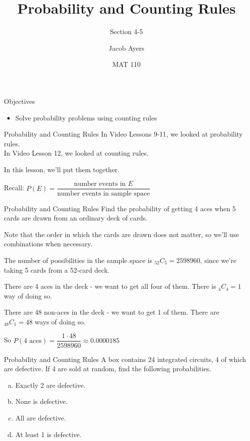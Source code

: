 \documentclass[t, aspectratio=169]{beamer}
\title[4-5]{Probability and Counting Rules}
\subtitle{Section 4-5}
\author{Jacob Ayers}
\institute{Lesson \#13}
\date{MAT 110}
\newcommand{\?}{\stackrel{?}{=}}
\begin{document}
	
	\begin{frame}
		\titlepage
	\end{frame}
	
	\begin{frame}{Objectives}
		\begin{itemize}
			\item Solve probability problems using counting rules
		\end{itemize}
	\end{frame}

	\begin{frame}{Probability and Counting Rules}
		In Video Lessons 9-11, we looked at probability rules. \\
		In Video Lesson 12, we looked at counting rules. \pause
		
		In this lesson, we'll put them together. \pause
		
		Recall: $P(E) = \dfrac{\text{number events in $E$}}{\text{number events in sample space}}$
	\end{frame}

	\begin{frame}{Probability and Counting Rules}
		Find the probability of getting 4 aces when 5 cards are drawn from an ordinary deck of cards. \pause
		
		Note that the order in which the cards are drawn does not matter, so we'll use combinations when necessary. \pause
		
		The number of possibilities in the sample space is $_{52} C _5 = 2598960$, since we're taking 5 cards from a 52-card deck.
		
		There are 4 aces in the deck - we want to get all four of them. There is $_4 C _4 = 1$ way of doing so. \pause
		
		There are 48 non-aces in the deck - we want to get 1 of them. There are $_{48} C _1 = 48$ ways of doing so. \pause
		
		So $P(\text{4 aces}) = \dfrac{1 \cdot 48}{2598960} \approx 0.0000185$
	\end{frame}

	\begin{frame}{Probability and Counting Rules}
		A box contains 24 integrated circuits, 4 of which are defective. If 4 are sold at random, find the following probabilities. \begin{enumerate}[a)]
			\item Exactly 2 are defective.
			\item None is defective.
			\item All are defective.
			\item At least 1 is defective.
		\end{enumerate}
	\end{frame}
\end{document}
